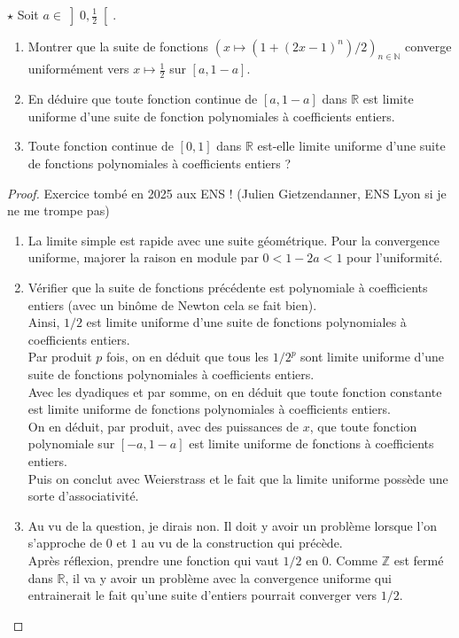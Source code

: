 \documentclass[french,a4paper]{article}
\newcommand{\N}{\mathbb{N}}
\newcommand{\Z}{\mathbb{Z}}
\newcommand{\R}{\mathbb{R}}
\theoremstyle{plain}
\theoremstyle{definition}
\theoremstyle{remark}
\begin{document}
\begin{ex}{$\star$}
	Soit $a\in\displaystyle\left]0,\frac{1}{2}\right[$.
	\begin{enumerate}
		\item Montrer que la suite de fonctions $\displaystyle\left(x\mapsto(1+(2x-1)^n)/2\right)_{n\in\N}$ converge uniformément vers $x\mapsto\displaystyle\frac12$ sur $[a,1-a]$.
		\item En déduire que toute fonction continue de $[a,1-a]$ dans $\R$ est limite uniforme d'une suite de fonction polynomiales à coefficients entiers.
		\item Toute fonction continue de $[0,1]$ dans $\R$ est-elle limite uniforme d'une suite de fonctions polynomiales à coefficients entiers ?
	\end{enumerate}
\end{ex}
\begin{proof}
	Exercice tombé en 2025 aux ENS ! (Julien Gietzendanner, ENS Lyon si je ne me trompe pas)
	\begin{enumerate}
		\item La limite simple est rapide avec une suite géométrique. Pour la convergence uniforme, majorer la raison en module par $0<1-2a<1$ pour l'uniformité.
		\item Vérifier que la suite de fonctions précédente est polynomiale à coefficients entiers (avec un binôme de Newton cela se fait bien). \\ Ainsi, $1/2$ est limite uniforme d'une suite de fonctions polynomiales à coefficients entiers. \\ Par produit $p$ fois, on en déduit que tous les $1/2^p$ sont limite uniforme d'une suite de fonctions polynomiales à coefficients entiers. \\  Avec les dyadiques et par somme, on en déduit que toute fonction constante est limite uniforme de fonctions polynomiales à coefficients entiers. \\ On en déduit, par produit, avec des puissances de $x$, que toute fonction polynomiale sur $[-a,1-a]$ est limite uniforme de fonctions à coefficients entiers. \\ Puis on conclut avec Weierstrass et le fait que la limite uniforme possède une sorte d'associativité.
		\item Au vu de la question, je dirais non. Il doit y avoir un problème lorsque l'on s'approche de $0$ et $1$ au vu de la construction qui précède. \\  Après réflexion, prendre une fonction qui vaut $1/2$ en $0$. Comme $\Z$ est fermé dans $\R$, il va y avoir un problème avec la convergence uniforme qui entrainerait le fait qu'une suite d'entiers pourrait converger vers $1/2$.
	\end{enumerate}
\end{proof}
\end{document}
